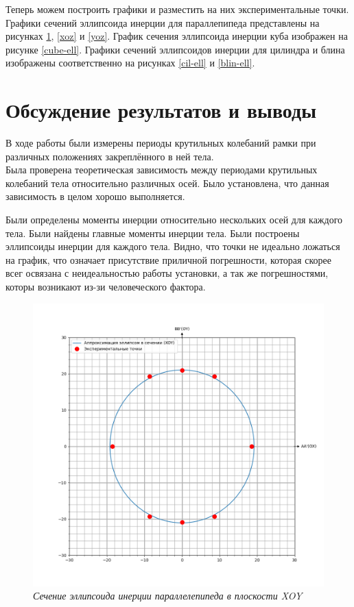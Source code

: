 \documentclass[a4paper,12pt]{article}
\begin{document}
Теперь можем построить графики и разместить на них экспериментальные точки. Графики сечений эллипсоида инерции для параллепипеда представлены на рисунках \ref{xoy}, \ref{xoz} и \ref{yoz}. График сечения эллипсоида инерции куба изображен на рисунке \ref{cube-ell}. Графики сечений эллипсоидов инерции для цилиндра и блина изображены соответственно на рисунках \ref{cil-ell} и \ref{blin-ell}.

\section{Обсуждение результатов и выводы}

В ходе работы были измерены периоды крутильных колебаний рамки при различных положениях закреплённого в ней тела. \\

Была проверена теоретическая зависимость между периодами крутильных колебаний тела относительно различных осей. Было установлена, что данная зависимость в целом хорошо выполняется.

Были определены моменты инерции относительно нескольких осей для каждого тела. Были найдены главные моменты инерции тела. Были построены эллипсоиды инерции для каждого тела. Видно, что точки не идеально ложаться на график, что означает присутствие приличной погрешности, которая скорее всег освязана с неидеальностью работы установки, а так же погрешностями, которы возникают из-зи человеческого фактора.

\newpage

\begin{figure}[h!]
    \includegraphics[width=1\textwidth]{xoy.png}
    \caption{\textit{Сечение эллипсоида инерции параллелепипеда в плоскости XOY}}
    \label{xoy}
\end{figure}
\end{document}
